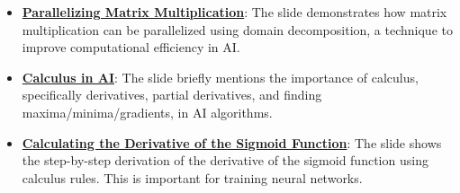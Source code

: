 \documentclass{article}%
\begin{document}
\begin{itemize}[leftmargin=*]
\item \href{\url{https://purdue.brightspace.com/d2l/common/assets/pdfjs-d2l-dist/1.0.14-legacy/web/viewer.html?file=\%252Fcontent\%252Fenforced\%252F1095467-wl.202510.CS.24300.001\%252F04L1-Linear\%20Algebra\%20Primer.pdf\%253Fou\%253D1095467\&lang=en-us\&container=d2l-fileviewer-rendered-pdf\&fullscreen=d2l-fileviewer-rendered-pdf-dialog\&height=667}#page=18}{\textbf{Parallelizing Matrix Multiplication}}: The slide demonstrates how matrix multiplication can be parallelized using domain decomposition, a technique to improve computational efficiency in AI.%
\item \href{\url{https://purdue.brightspace.com/d2l/common/assets/pdfjs-d2l-dist/1.0.14-legacy/web/viewer.html?file=\%252Fcontent\%252Fenforced\%252F1095467-wl.202510.CS.24300.001\%252F04L1-Linear\%20Algebra\%20Primer.pdf\%253Fou\%253D1095467\&lang=en-us\&container=d2l-fileviewer-rendered-pdf\&fullscreen=d2l-fileviewer-rendered-pdf-dialog\&height=667}#page=19}{\textbf{Calculus in AI}}: The slide briefly mentions the importance of calculus, specifically derivatives, partial derivatives, and finding maxima/minima/gradients, in AI algorithms.%
\item \href{\url{https://purdue.brightspace.com/d2l/common/assets/pdfjs-d2l-dist/1.0.14-legacy/web/viewer.html?file=\%252Fcontent\%252Fenforced\%252F1095467-wl.202510.CS.24300.001\%252F04L1-Linear\%20Algebra\%20Primer.pdf\%253Fou\%253D1095467\&lang=en-us\&container=d2l-fileviewer-rendered-pdf\&fullscreen=d2l-fileviewer-rendered-pdf-dialog\&height=667}#page=21}{\textbf{Calculating the Derivative of the Sigmoid Function}}: The slide shows the step-by-step derivation of the derivative of the sigmoid function using calculus rules. This is important for training neural networks.%
\end{itemize}%
\end{document}
